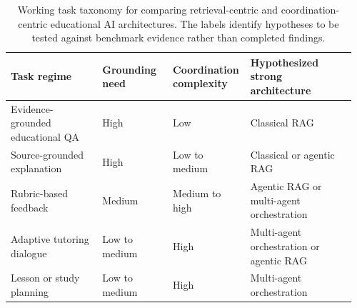 \begin{table}[t]
\centering
\small
\begingroup
\setlength{\tabcolsep}{4pt}
\begin{tabular}{@{}>{\raggedright\arraybackslash}p{0.26\linewidth}>{\raggedright\arraybackslash}p{0.2\linewidth}>{\raggedright\arraybackslash}p{0.2\linewidth}>{\raggedright\arraybackslash}p{0.3\linewidth}@{}}
\toprule
Task regime & Grounding need & \shortstack[c]{Coordination\\complexity} & \shortstack[c]{Hypothesized strong\\architecture} \\
\midrule
Evidence-grounded educational QA & High & Low & Classical RAG \\
Source-grounded explanation & High & Low to medium & Classical or agentic RAG \\
Rubric-based feedback & Medium & Medium to high & Agentic RAG or multi-agent orchestration \\
Adaptive tutoring dialogue & Low to medium & High & Multi-agent orchestration or agentic RAG \\
Lesson or study planning & Low to medium & High & Multi-agent orchestration \\
\bottomrule
\end{tabular}
\endgroup
\caption{Working task taxonomy for comparing retrieval-centric and coordination-centric educational AI architectures. The labels identify hypotheses to be tested against benchmark evidence rather than completed findings.}
\label{tab:task-taxonomy}
\end{table}

